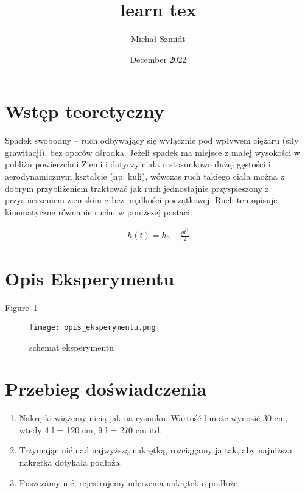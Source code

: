 \documentclass{article}
\title{learn tex}
\author{Michał Szmidt}
\date{December 2022}
\begin{document}
	
	\maketitle
	
	\section{Wstęp teoretyczny}
	Spadek swobodny – ruch odbywający się wyłącznie pod wpływem ciężaru (siły grawitacji), bez oporów ośrodka. Jeżeli spadek ma miejsce z małej wysokości w pobliżu powierzchni Ziemi i dotyczy ciała o stosunkowo dużej gęstości i aerodynamicznym kształcie (np. kuli), wówczas ruch takiego ciała można z dobrym przybliżeniem traktować jak ruch jednostajnie przyspieszony z przyspieszeniem ziemskim g bez prędkości początkowej. Ruch ten opisuje kinematyczne równanie ruchu w poniższej postaci.
	
	\begin{equation} \label{eq1}
		\begin{split}
			h\left(t\right)=h_0-\frac{gt^2}{2}
		\end{split}
	\end{equation}
	
	\section{Opis Eksperymentu}
	
	Figure~\ref{schemat eksperymentu}
	\begin{figure}[!htbp]
		\centering
		\texttt{[image: opis\_eksperymentu.png]}
		\caption{schemat eksperymentu}
		\label{schemat eksperymentu}
	\end{figure}
	
	\section{Przebieg doświadczenia}
	
	\begin{enumerate}
		\item Nakrętki wiążemy nicią jak na rysunku. Wartość l może wynosić 30 cm, wtedy 4 l = 120 cm, 9 l = 270 cm itd.
		\item Trzymając nić nad najwyższą nakrętką, rozciągamy ją tak, aby najniższa nakrętka dotykała podłoża.
		\item Puszczamy nić, rejestrujemy uderzenia nakrętek o podłoże.
	\end{enumerate}
	
\end{document}
